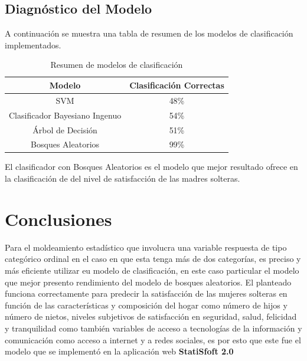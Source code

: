 \documentclass[11pt,twoside]{article}
\begin{document}
\subsection{Diagnóstico del Modelo}

A continuación se muestra una tabla de resumen de los modelos de clasificación implementados. 

\begin{table}[H]
		\caption{\small{Resumen de modelos de clasificación}}
	\centering
	\begin{tabular}{@{}cc@{}}
		\toprule
		Modelo                         & Clasificación Correctas \\ \midrule
		SVM                            & 48\%                    \\
		Clasificador Bayesiano Ingenuo & 54\%                    \\
		Árbol de Decisión              & 51\%                    \\
		Bosques Aleatorios             & 99\%                    \\ \bottomrule
	\end{tabular}
\end{table}

\noindent
El clasificador con Bosques Aleatorios es el modelo que mejor resultado ofrece en la clasificación de del nivel de satisfacción de las madres solteras. 



\section{Conclusiones}


Para el moldeamiento estadístico que involucra una variable respuesta de tipo categórico ordinal en el caso en que esta tenga más de dos categorías, es preciso y más eficiente utilizar eu modelo de clasificación, en este caso particular el modelo que mejor presento rendimiento del modelo de bosques aleatorios. El planteado funciona correctamente para predecir la satisfacción de las mujeres solteras en función de las características y composición del hogar como número de hijos y número de nietos, niveles subjetivos de satisfacción en seguridad, salud, felicidad y tranquilidad como también variables de acceso a tecnologías de la información y comunicación como acceso a internet y a redes sociales, es por esto que este fue el modelo que se implementó en la aplicación web \textbf{StatiSfoft 2.0}
\end{document}
